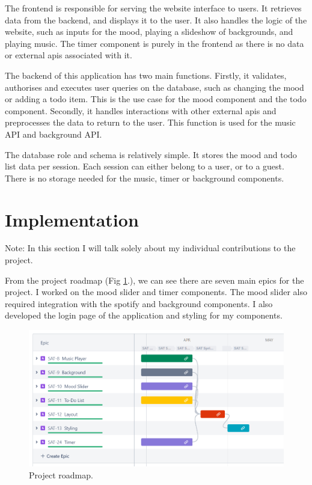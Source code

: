 \documentclass[conference]{IEEEtran}
\begin{document}
The frontend is responsible for serving the website interface to users. It retrieves data from the backend, and displays it to the user. It also handles the logic of the website, such as inputs for the mood, playing a slideshow of backgrounds, and playing music. The timer component is purely in the frontend as there is no data or external apis associated with it.

The backend of this application has two main functions. Firstly, it validates, authorises and executes user queries on the database, such as changing the mood or adding a todo item. This is the use case for the mood component and the todo component. Secondly, it handles interactions with other external apis and preprocesses the data to return to the user. This function is used for the music API and background API.

The database role and schema is relatively simple. It stores the mood and todo list data per session. Each session can either belong to a user, or to a guest. There is no storage needed for the music, timer or background components.


\section{Implementation}

Note: In this section I will talk solely about my individual contributions to the project.

From the project roadmap (Fig \ref{roadmap}.), we can see there are seven main epics for the project. I worked on the mood slider and timer components. The mood slider also required integration with the spotify and background components. I also developed the login page of the application and styling for my components.

\begin{figure}[htbp]
\centerline{\includegraphics[width = \linewidth]{project-roadmap.png}}
\caption{Project roadmap.}
\label{roadmap}
\end{figure}
\end{document}

